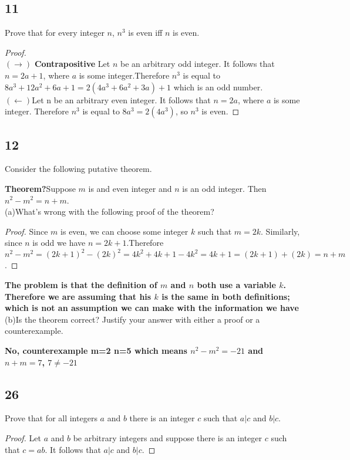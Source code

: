 \documentclass{article}
\begin{document}
\subsection{11}
Prove that for every integer $n$, $n^3$ is even iff $n$ is even.
\begin{proof}$ $\\
$(\rightarrow)$ \textbf{Contrapositive} Let $n$ be an arbitrary odd integer. It follows that $n=2a+1$, where $a$ is some integer.Therefore $n^3$ is equal to $8a^3 + 12a^2 + 6a +1 = 2(4a^3 + 6a^2 +3a) + 1$ which is an odd number.
$ $\\
$(\leftarrow)$Let n  be an arbitrary even integer. It follows that $n=2a$, where $a$ is some integer. Therefore $n^3$ is equal to $8a^3 = 2(4a^3)$, so $n^3$ is even.
\end{proof}

\newpage
\subsection{12}
Consider the following putative theorem.

\textbf{Theorem?}Suppose $m$ is and even integer and $n$ is an odd integer. Then $n^2 -m^2 = n+m$.
\\
(a)What's wrong with the following proof of the theorem?

\begin{proof}
Since $m$ is even, we can choose some integer $k$ such that  $m=2k$. Similarly, since $n$ is odd we have $n=2k+1$.Therefore 
$n^2-m^2=(2k+1)^2-(2k)^2=4k^2+4k+1-4k^2=4k+1=(2k+1)+(2k)=n+m$.
\end{proof}

\textbf{The problem is that the definition of $m$ and $n$ both use a variable $k$. Therefore we are assuming that his $k$ is the same in both definitions; which is not an assumption we can make with the information we have}
\\
(b)Is the theorem correct? Justify your answer with either a proof or a counterexample.

\textbf{No, counterexample m=2 n=5 which means $n^2-m^2=-21$ and $n+m=7$, $ 7\neq -21$}
\subsection{26}
Prove that for all integers $a$ and $b$ there is an integer $c$ such that $a|c$ and $b|c$.
\begin{proof}
Let $a$ and $b$ be arbitrary integers and suppose there is an integer $c$ such that $c=ab$. It follows that $a|c$ and $b|c$.
\end{proof}
\end{document}
